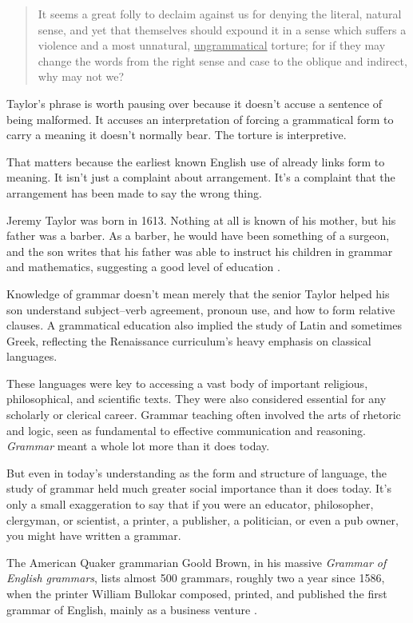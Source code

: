 \begin{quote}
    It seems a great folly to declaim against us for denying the literal, natural sense, and yet that themselves should expound it in a sense which suffers a violence and a most unnatural, \uline{ungrammatical} torture; for if they may change the words from the right sense and case to the oblique and indirect, why may not we?\hfill\citep{taylor1654real}
\end{quote}

Taylor's phrase is worth pausing over because it doesn't accuse a
sentence of being malformed. It accuses an interpretation of forcing a
grammatical form to carry a meaning it doesn't normally bear. The torture
is interpretive.

That matters because the earliest known English use of
 already links form to meaning. It isn't just a
complaint about arrangement. It's a complaint that the arrangement has
been made to say the wrong thing.

Jeremy Taylor was born in 1613. Nothing at all is known of his mother, but his father was a barber. As a barber, he would have been something of a surgeon, and the son writes that his father was able to instruct his children in grammar and mathematics, suggesting a good level of education \citep[28]{worley_jeremy_taylor_1904}. 

Knowledge of grammar doesn't mean merely that the senior Taylor helped
his son understand subject--verb agreement, pronoun use, and how to form
relative clauses. A grammatical education also implied the study of Latin
and sometimes Greek, reflecting the Renaissance curriculum's heavy
emphasis on classical languages.

These languages were key to accessing a vast body of important religious,
philosophical, and scientific texts. They were also considered essential
for any scholarly or clerical career. Grammar teaching often involved the
arts of rhetoric and logic, seen as fundamental to effective
communication and reasoning. \textit{Grammar} meant a whole lot more than
it does today.

But even in today's understanding as the form and structure of language, the study of grammar held much greater social importance than it does today. It's only a small exaggeration to say that if you were an educator, philosopher, clergyman, or scientist, a printer, a publisher, a politician, or even a pub owner, you might have written a grammar. 

The American Quaker grammarian Goold Brown, in his massive
\textit{Grammar of English grammars}, lists almost 500 grammars, roughly
two a year since 1586, when the printer William Bullokar composed,
printed, and published the first grammar of English, mainly as a business
venture \citep{brown_grammar_grammars}.

